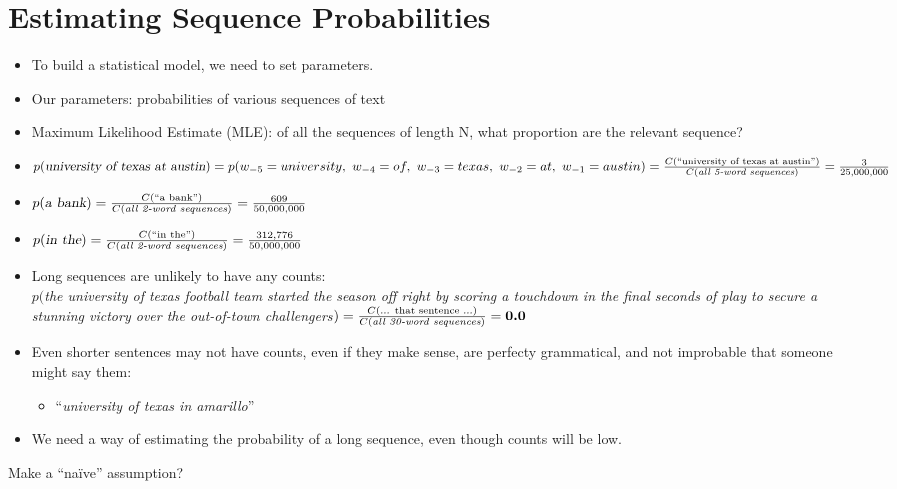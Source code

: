 \documentclass[11pt,letterpaper]{article}
\begin{document}
\section{Estimating Sequence Probabilities}

\begin{itemize}
  \item To build a statistical model, we need to set parameters.
  \item Our parameters: probabilities of various sequences of text
  \item Maximum Likelihood Estimate (MLE): of all the sequences of length N, what proportion are the relevant sequence?
  \item $p(\textsl{university of texas at austin}) \\
        = p(w_{-5}=university, ~ w_{-4}=of, ~ w_{-3}=texas, ~ w_{-2}=at, ~ w_{-1}=austin)\\
        = \frac{C(\text{``university of texas at austin''})}{C(\textit{all 5-word sequences})}
        = \frac {3}{25,000,000}$
  \\
  \item $p(\textsl{a bank}) = \frac{C(\text{``a bank''})}{C(\textit{all 2-word sequences})} = \frac{609}{50,000,000}$
  \item $p(\textsl{in the}) = \frac{C(\text{``in the''})}{C(\textit{all 2-word sequences})} = \frac{312,776}{50,000,000}$
  \\
  \item Long sequences are unlikely to have any counts: \\
  $p($\textsl{the university of texas football team started the season off right by scoring a touchdown in the final seconds of play to secure a stunning victory over the out-of-town challengers}$) \\
  = \frac{C(\text{... that sentence ...})}{C(\textit{all 30-word sequences})} = \textbf{0.0}$
  \item Even shorter sentences may not have counts, even if they make sense, are perfecty grammatical, and not improbable that someone might say them: 
    \begin{itemize} \item ``\textsl{university of texas in amarillo}'' \end{itemize}
  \item We need a way of estimating the probability of a long sequence, even though counts will be low.
\end{itemize}

Make a ``na\"{i}ve'' assumption?
\end{document}
